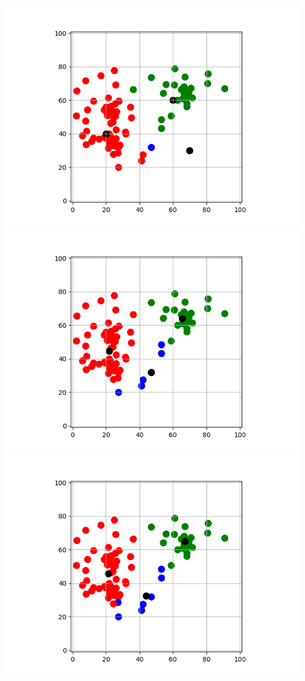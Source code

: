 \documentclass[11pt,class=report,crop=false]{standalone}
\begin{document}
\begin{activite}[Barycentres]
\begin{enumerate}
	
	\begin{center}
	\includegraphics[scale=\myscale,scale=0.32]{ecran_barycentres_exemple_02}
	\includegraphics[scale=\myscale,scale=0.32]{ecran_barycentres_exemple_03}
	\includegraphics[scale=\myscale,scale=0.32]{ecran_barycentres_exemple_04}

\end{center}
\end{enumerate}
\end{activite}
\end{document}
